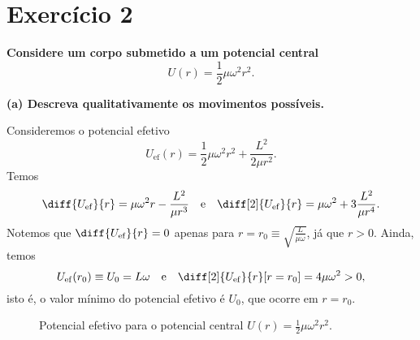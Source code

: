 \section*{Exercício 2}

\textbf{Considere um corpo submetido a um potencial central}
    \begin{equation*}
        U(r) = \frac12 \mu \omega^2r^2.
    \end{equation*}

\textbf{(a) Descreva qualitativamente os movimentos possíveis. }

Consideremos o potencial efetivo
\begin{equation}
    U_\mathrm{ef}(r) = \frac{1}{2}\mu\omega^2 r^2 + \frac{L^2}{2\mu r^2}.
\end{equation}
Temos
\begin{equation}
    \diff{U_\mathrm{ef}}{r} = \mu\omega^2 r - \frac{L^2}{\mu r^3}\quad\text{e}\quad\diff[2]{U_\mathrm{ef}}{r} = \mu\omega^2 + 3\frac{L^2}{\mu r^4}.
\end{equation}
Notemos que \(\diff{U_\mathrm{ef}}{r} = 0\) apenas para \(r = r_0 \equiv \sqrt{\frac{L}{\mu\omega}}\), já que \(r > 0\). Ainda, temos
\begin{equation}
    U_\mathrm{ef}(r_0) \equiv U_0 = L\omega\quad\text{e}\quad\diff[2]{U_\mathrm{ef}}{r}[r=r_0] = 4\mu\omega^2 > 0,
\end{equation}
isto é, o valor mínimo do potencial efetivo é \(U_0\), que ocorre em \(r = r_0\).

\begin{figure}[H]
    \centering
    \caption{Potencial efetivo para o potencial central \(U(r) = \frac12 \mu\omega^2r^2\).}
\end{figure}

